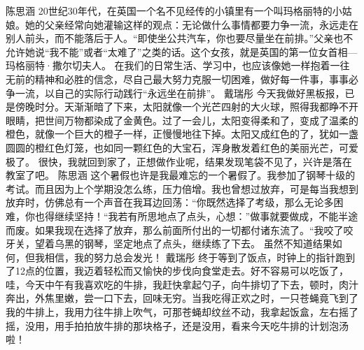 \markdownRendererDocumentBegin
{}\markdownRendererInterblockSeparator
{}\markdownRendererInterblockSeparator
{}陈思涵\markdownRendererInterblockSeparator
{}20世纪30年代，在英国一个名不见经传的小镇里有一个叫玛格丽特的小姑娘。她的父亲经常向她灌输这样的观点：无论做什么事情都要力争一流，永远走在别人前头，而不能落后于人。“即使坐公共汽车，你也要尽量坐在前排。”父亲也不允许她说“我不能”或者“太难了”之类的话。这个女孩，就是英国的第一位女首相—玛格丽特·撒尔切夫人。 在我们的日常生活、学习中，也应该像她一样抱着一往无前的精神和必胜的信念，尽自己最大努力克服一切困难，做好每一件事，事事必争一流，以自己的实际行动践行“永远坐在前排”。\markdownRendererInterblockSeparator
{}\markdownRendererInterblockSeparator
{}戴瑞彤\markdownRendererInterblockSeparator
{}今天我做好黑板报，已是傍晚时分。天渐渐暗了下来，太阳就像一个光芒四射的大火球，照得我都睁不开眼睛，把世间万物都染成了金黄色。过了一会儿，太阳变得柔和了，变成了温柔的橙色，就像一个巨大的橙子一样，正慢慢地往下掉。太阳又成红色的了，犹如一盏圆圆的橙红色灯笼，也如同一颗红色的大宝石，浑身散发着红色的美丽光芒，可爱极了。\markdownRendererInterblockSeparator
{}很快，我就回到家了，正想做作业呢，结果发现笔袋不见了，兴许是落在教室了吧。\markdownRendererInterblockSeparator
{}\markdownRendererInterblockSeparator
{}陈思涵\markdownRendererInterblockSeparator
{}这个暑假也许是我最难忘的一个暑假了。我参加了钢琴十级的考试。而且因为上个学期没怎么练，压力倍增。我也曾想过放弃，可是每当我想到放弃时，仿佛总有一个声音在我耳边回荡：“你既然选择了考级，那么无论多困难，你也得继续坚持！“我若有所思地点了点头，心想：”做事就要做成，不能半途而废。如果我现在选择了放弃，那么前面所付出的一切都付诸东流了。“我咬了咬牙关，望着乌黑的钢琴，坚定地点了点头，继续练了下去。 虽然不知道结果如何，但我相信，我的努力总会发光！\markdownRendererInterblockSeparator
{}\markdownRendererInterblockSeparator
{}戴瑞彤\markdownRendererInterblockSeparator
{}终于等到了饭点，时钟上的指针跑到了12点的位置，我迈着轻松而又愉快的步伐向食堂走去。好不容易可以吃饭了，哇，今天中午有我喜欢吃的牛排，我赶快拿起勺子，向牛排切了下去，顿时，肉汁奔出，外焦里嫩，尝一口下去，回味无穷。当我吃得正欢之时，一只苍蝇竟飞到了我的牛排上，我用力往牛排上吹气，可那苍蝇却纹丝不动，我拿起饭盒，左右摇了摇，没用，用手拍拍放牛排的那块格子，还是没用，看来今天吃牛排的计划泡汤啦！\markdownRendererInterblockSeparator
{}\markdownRendererInterblockSeparator
